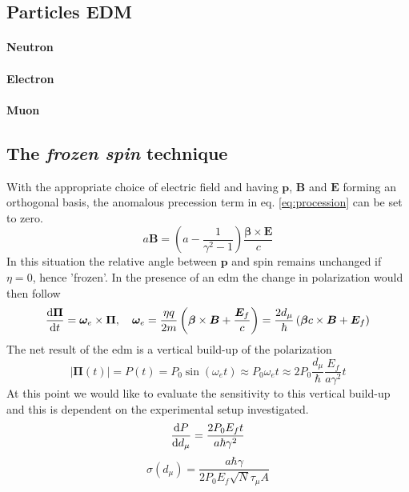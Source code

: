 \begin{refsection}
\subsection{Particles EDM}
\paragraph{Neutron}
\paragraph{Electron} 
\paragraph{Muon} 

\subsection{The \textit{frozen spin} technique}
        \cite{1,9} 
        With the appropriate choice of electric field and having $\bm{p}$, $\bm{B}$ and $\bm{E}$ forming an orthogonal basis, the anomalous precession term in eq. \ref{eq:procession} can be set to zero. 
        \begin{equation}
            a\bm{B}=\left( a-\frac{1}{\gamma^2-1} \right)\frac{\bm{\beta}\times\bm{E}}{c}
        \end{equation}
        In this situation the relative angle between $\bm{p}$ and spin remains unchanged if $\eta=0$, hence 'frozen'. 
        In the presence of an \gls{edm} the change in polarization would then follow
        \begin{equation}
            \label{eq:freezed}
            \dv{\bm{\Pi}}{t}=\bm{\omega}_e \times \bm{\Pi}, \quad
            \bm{\omega}_e=\frac{\eta q}{2m} \left(\bm{\beta}\times\bm{B}+\frac{\bm{E}_f}{c} \right) =
            \frac{2 d_\mu}{\hbar} \left(\bm{\beta}c\times\bm{B}+\bm{E}_f\right)
        \end{equation}
        The net result of the \gls{edm} is a vertical build-up of the polarization
        \begin{equation}
            |\bm{\Pi}(t)|=P(t)=P_0\sin(\omega_e t)\approx P_0 \omega_e t \approx 2P_0\frac{d_\mu}{\hbar}\frac{E_f}{a\gamma^2}t
        \end{equation}    
        At this point we would like to evaluate the sensitivity to this vertical build-up and this is dependent on the experimental setup investigated.
        \begin{equation}
            \dv{P}{d_\mu}=\frac{2P_0E_ft}{a\hbar\gamma^2}
        \end{equation}     
        \begin{equation}
           \sigma(d_\mu)=\frac{a\hbar\gamma}{2P_0E_f\sqrt{N}\tau_\mu A}
        \end{equation}                 


\end{refsection}
